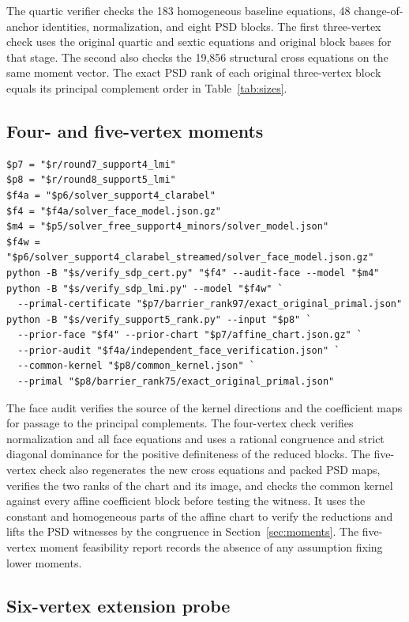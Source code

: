 The quartic verifier checks the 183 homogeneous baseline equations, 48 change-of-anchor identities, normalization, and eight PSD blocks. The first three-vertex check uses the original quartic and sextic equations and original block bases for that stage. The second also checks the 19{,}856 structural cross equations on the same moment vector. The exact PSD rank of each original three-vertex block equals its principal complement order in Table~\ref{tab:sizes}.

\subsection{Four- and five-vertex moments}

\begin{verbatim}
$p7 = "$r/round7_support4_lmi"
$p8 = "$r/round8_support5_lmi"
$f4a = "$p6/solver_support4_clarabel"
$f4 = "$f4a/solver_face_model.json.gz"
$m4 = "$p5/solver_free_support4_minors/solver_model.json"
$f4w = "$p6/solver_support4_clarabel_streamed/solver_face_model.json.gz"
python -B "$s/verify_sdp_cert.py" "$f4" --audit-face --model "$m4"
python -B "$s/verify_sdp_lmi.py" --model "$f4w" `
  --primal-certificate "$p7/barrier_rank97/exact_original_primal.json"
python -B "$s/verify_support5_rank.py" --input "$p8" `
  --prior-face "$f4" --prior-chart "$p7/affine_chart.json.gz" `
  --prior-audit "$f4a/independent_face_verification.json" `
  --common-kernel "$p8/common_kernel.json" `
  --primal "$p8/barrier_rank75/exact_original_primal.json"
\end{verbatim}

The face audit verifies the source of the kernel directions and the coefficient maps for passage to the principal complements. The four-vertex check verifies normalization and all face equations and uses a rational congruence and strict diagonal dominance for the positive definiteness of the reduced blocks. The five-vertex check also regenerates the new cross equations and packed PSD maps, verifies the two ranks of the chart and its image, and checks the common kernel against every affine coefficient block before testing the witness. It uses the constant and homogeneous parts of the affine chart to verify the reductions and lifts the PSD witnesses by the congruence in Section~\ref{sec:moments}. The five-vertex moment feasibility report records the absence of any assumption fixing lower moments.

\subsection{Six-vertex extension probe}


